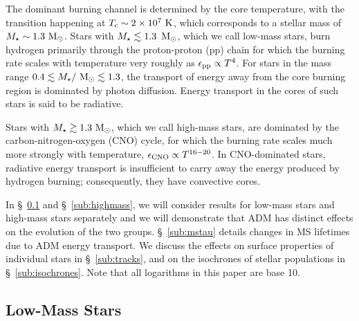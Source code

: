 \documentclass[useAMS,usenatbib]{mnras}
\begin{document}
The dominant burning channel is determined by the core temperature, 
with the transition happening at $T_\mathrm{c} \sim 2 \times 10^7 \ \mathrm{K}$, 
which corresponds to a stellar mass of $M_{\star} \sim1.3 \ \mathrm{M}_{\odot}$.
Stars with $M_{\star} \lesssim 1.3 \, \ \mathrm{M}_{\odot}$, which we call low-mass stars, 
burn hydrogen primarily through the proton-proton (pp) chain 
for which the burning rate scales with temperature very roughly as $\epsilon_{\mathrm{pp}} \propto T^4$. 
For stars in the mass range $0.4 \lesssim M_{\star}/\ \mathrm{M}_{\odot} \lesssim 1.3$, 
the transport of energy away from the core burning region is dominated 
by photon diffusion. Energy transport in the cores of such stars is said 
to be radiative.

Stars with $M_{\star} \gtrsim 1.3 \ \mathrm{M}_{\odot}$, 
which we call high-mass stars, 
are dominated by the carbon-nitrogen-oxygen (CNO) cycle, 
for which the burning rate scales much more strongly with temperature, 
$\epsilon_{\mathrm{CNO}} \propto T^{16-20}$. In CNO-dominated stars, 
radiative energy transport is insufficient 
to carry away the energy produced by hydrogen burning; consequently, they have convective cores.


In \S~\ref{sub:lowmass} and \S~\ref{sub:highmass}, we will consider results for low-mass stars and high-mass stars separately and we will demonstrate that ADM has distinct effects on the evolution of the two groups. \S~\ref{sub:mstau} details changes in MS lifetimes due to ADM energy transport. We discuss the effects on surface properties of individual stars in \S~\ref{sub:tracks}, and on the isochrones of stellar populations in \S~\ref{sub:isochrones}.
Note that all logarithms in this paper are base 10.



\subsection{Low-Mass Stars}
\label{sub:lowmass}
\end{document}
